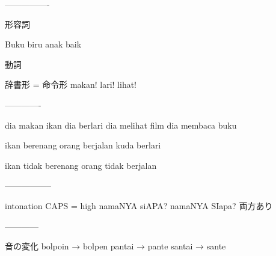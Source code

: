 \documentclass[uplatex]{jsarticle}
\begin{document}
----------------

形容詞

Buku biru
anak baik

動詞

辞書形 = 命令形
makan!
lari!
lihat!

-------------

dia makan ikan
dia berlari
dia melihat film
dia membaca buku

ikan berenang
orang berjalan
kuda berlari

ikan tidak berenang
orang tidak berjalan

-----------------

intonation
CAPS = high
namaNYA siAPA?
namaNYA SIapa?
両方あり

------------

音の変化
bolpoin → bolpen
pantai → pante
santai → sante
\end{document}
